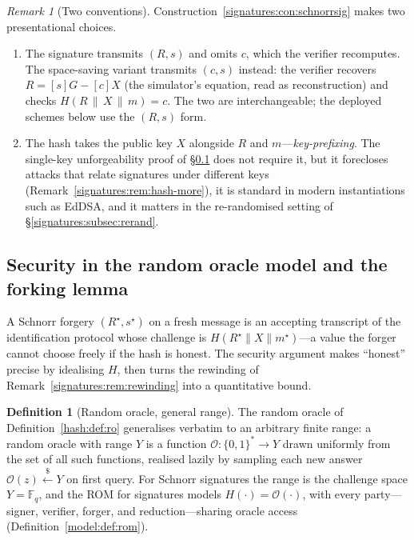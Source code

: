 \documentclass[11pt,a4paper]{article}
\theoremstyle{definition}
\newtheorem{definition}[theorem]{Definition}
\theoremstyle{remark}
\newtheorem{remark}[theorem]{Remark}
\newcommand{\Fq}{\ensuremath{\mathbb{F}_{q}}}
\begin{document}
\begin{remark}[Two conventions]\label{signatures:rem:sig-conventions}
Construction~\ref{signatures:con:schnorrsig} makes two presentational
choices.
\begin{enumerate}
\item The signature transmits \((R, s)\) and omits \(c\), which the
  verifier recomputes. The space-saving variant transmits
  \((c, s)\) instead: the verifier recovers \(R = [s]G - [c]X\)
  (the simulator's equation, read as reconstruction) and checks
  \(H(R \,\|\, X \,\|\, m) = c\). The two are interchangeable; the
  deployed schemes below use the \((R, s)\) form.
\item The hash takes the public key \(X\) alongside \(R\) and
  \(m\)---\emph{key-prefixing}. The single-key unforgeability proof
  of \S\ref{signatures:subsec:romforking} does not require it, but
  it forecloses attacks that relate signatures under different keys
  (Remark~\ref{signatures:rem:hash-more}), it is standard in modern
  instantiations such as EdDSA, and it matters in the
  re-randomised setting of \S\ref{signatures:subsec:rerand}.
\end{enumerate}
\end{remark}

\subsection{Security in the random oracle model and the forking
lemma}\label{signatures:subsec:romforking}

A Schnorr forgery \((R^{\star}, s^{\star})\) on a fresh message is an
accepting transcript of the identification protocol whose challenge is
\(H(R^{\star} \| X \| m^{\star})\)---a value the forger cannot
choose freely if the hash is honest. The security argument makes
``honest'' precise by idealising \(H\), then turns the rewinding of
Remark~\ref{signatures:rem:rewinding} into a quantitative bound.

\begin{definition}[Random oracle, general range]
\label{signatures:def:rom-range}
The random oracle of Definition~\ref{hash:def:ro} generalises
verbatim to an arbitrary finite range: a random oracle with range
\(Y\) is a function \(\mathcal O \colon \{0,1\}^{*} \to Y\) drawn
uniformly from the set of all such functions, realised lazily by
sampling each new answer \(\mathcal O(z) \xleftarrow{\$} Y\) on
first query. For Schnorr signatures the range is the challenge
space \(Y = \Fq\), and the ROM for signatures models
\(H(\cdot) = \mathcal O(\cdot)\), with every party---signer,
verifier, forger, and reduction---sharing oracle access
(Definition~\ref{model:def:rom}).
\end{definition}
\end{document}
